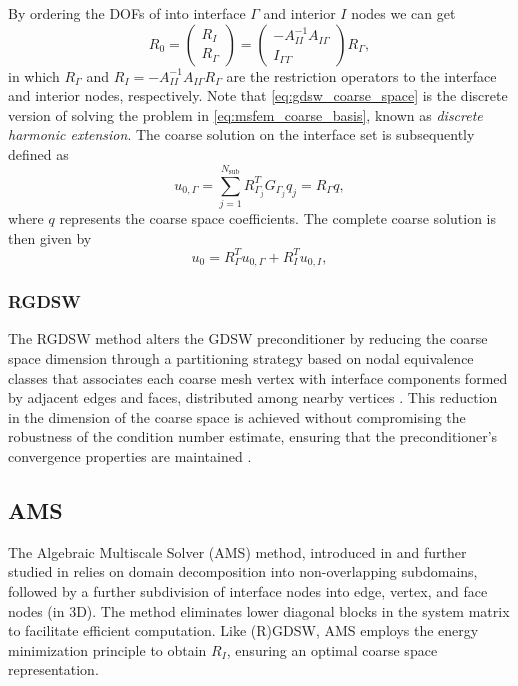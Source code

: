 By ordering the DOFs of into interface $\Gamma$ and interior $I$ nodes we can get \cite[Equation 4,5]{ams_coarse_space_comp_study_Alves2024}
\begin{equation}
    R_0 =
    \begin{pmatrix}
        R_I \\
        R_{\Gamma}
    \end{pmatrix} =
    \begin{pmatrix}
        -A_{II}^{-1} A_{I\Gamma} \\
        I_{\Gamma\Gamma}
    \end{pmatrix} R_{\Gamma},
    \label{eq:gdsw_coarse_space}
\end{equation}
in which $R_{\Gamma}$ and $R_I = -A_{II}^{-1} A_{I\Gamma} R_{\Gamma}$ are the restriction operators to the interface and interior nodes, respectively. Note that \cref{eq:gdsw_coarse_space} is the discrete version of solving the problem in \cref{eq:msfem_coarse_basis}, known as \textit{discrete harmonic extension}. The coarse solution on the interface set is subsequently defined as
\[
    u_{0,\Gamma} = \sum_{j=1}^{N_{\text{sub}}} R^T_{\Gamma_j} G_{\Gamma_j} q_j = R_{\Gamma} q,
\]
where $q$ represents the coarse space coefficients. The complete coarse solution is then given by
\[
    u_0 = R^T_{\Gamma} u_{0,\Gamma} + R^T_I u_{0,I},
\]

\subsubsection{RGDSW}
The RGDSW method alters the GDSW preconditioner by reducing the coarse space dimension through a partitioning strategy based on nodal equivalence classes that associates each coarse mesh vertex with interface components formed by adjacent edges and faces, distributed among nearby vertices \cite{rgdsw_coarse_space_Dohrmann2017}. This reduction in the dimension of the coarse space is achieved without compromising the robustness of the condition number estimate, ensuring that the preconditioner's convergence properties are maintained \cite{argdsw_coarse_space_Heinlein2022}.

\subsection{AMS}
The Algebraic Multiscale Solver (AMS) method, introduced in \cite{msfvm_ams_Lunati2009,ams_framework_Wang2014} and further studied in \cite{ams_coarse_space_comp_study_Alves2024} relies on domain decomposition into non-overlapping subdomains, followed by a further subdivision of interface nodes into edge, vertex, and face nodes (in 3D). The method eliminates lower diagonal blocks in the system matrix to facilitate efficient computation. Like (R)GDSW, AMS employs the energy minimization principle to obtain $R_I$, ensuring an optimal coarse space representation.

